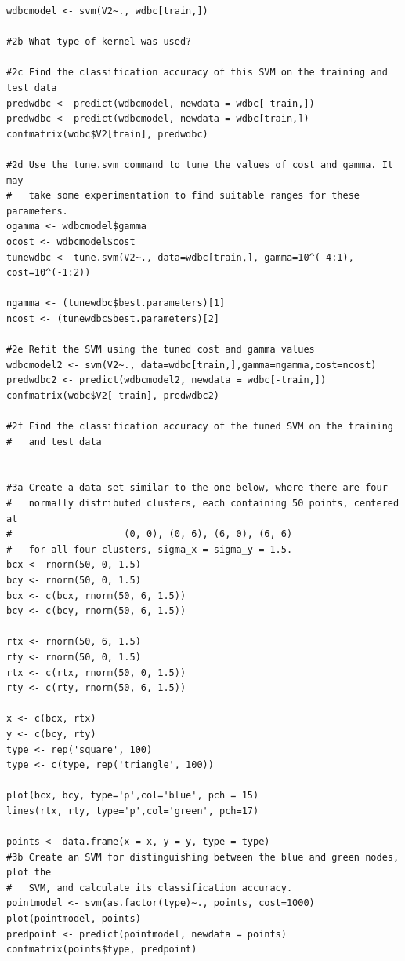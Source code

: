 \documentclass[11pt]{article}
\begin{document}
\begin{Verbatim}
wdbcmodel <- svm(V2~., wdbc[train,])

#2b What type of kernel was used? 

#2c Find the classification accuracy of this SVM on the training and test data
predwdbc <- predict(wdbcmodel, newdata = wdbc[-train,])
predwdbc <- predict(wdbcmodel, newdata = wdbc[train,])
confmatrix(wdbc$V2[train], predwdbc)

#2d Use the tune.svm command to tune the values of cost and gamma. It may 
#   take some experimentation to find suitable ranges for these parameters. 
ogamma <- wdbcmodel$gamma
ocost <- wdbcmodel$cost
tunewdbc <- tune.svm(V2~., data=wdbc[train,], gamma=10^(-4:1), cost=10^(-1:2))

ngamma <- (tunewdbc$best.parameters)[1]
ncost <- (tunewdbc$best.parameters)[2]

#2e Refit the SVM using the tuned cost and gamma values
wdbcmodel2 <- svm(V2~., data=wdbc[train,],gamma=ngamma,cost=ncost)
predwdbc2 <- predict(wdbcmodel2, newdata = wdbc[-train,])
confmatrix(wdbc$V2[-train], predwdbc2)

#2f Find the classification accuracy of the tuned SVM on the training 
#   and test data


#3a Create a data set similar to the one below, where there are four 
#   normally distributed clusters, each containing 50 points, centered at 
#                    (0, 0), (0, 6), (6, 0), (6, 6)
#   for all four clusters, sigma_x = sigma_y = 1.5.
bcx <- rnorm(50, 0, 1.5)
bcy <- rnorm(50, 0, 1.5)
bcx <- c(bcx, rnorm(50, 6, 1.5))
bcy <- c(bcy, rnorm(50, 6, 1.5))

rtx <- rnorm(50, 6, 1.5)
rty <- rnorm(50, 0, 1.5)
rtx <- c(rtx, rnorm(50, 0, 1.5))
rty <- c(rty, rnorm(50, 6, 1.5))

x <- c(bcx, rtx)
y <- c(bcy, rty)
type <- rep('square', 100)
type <- c(type, rep('triangle', 100))

plot(bcx, bcy, type='p',col='blue', pch = 15)
lines(rtx, rty, type='p',col='green', pch=17)

points <- data.frame(x = x, y = y, type = type)
#3b Create an SVM for distinguishing between the blue and green nodes, plot the 
#   SVM, and calculate its classification accuracy.
pointmodel <- svm(as.factor(type)~., points, cost=1000)
plot(pointmodel, points)
predpoint <- predict(pointmodel, newdata = points)
confmatrix(points$type, predpoint)

\end{Verbatim} 
\end{document}
